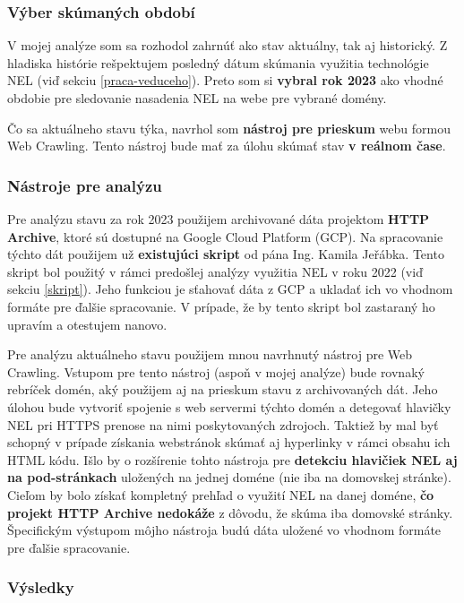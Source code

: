 \subsubsection{Výber skúmaných období}

V mojej analýze som sa rozhodol zahrnúť ako stav aktuálny, tak aj historický.
Z hladiska histórie rešpektujem posledný dátum skúmania využitia technológie NEL (viď sekciu \ref{praca-veduceho}).
Preto som si \textbf{vybral rok 2023} ako vhodné obdobie pre sledovanie nasadenia NEL na webe pre vybrané domény.

Čo sa aktuálneho stavu týka, navrhol som \textbf{nástroj pre prieskum} webu formou Web Crawling.
Tento nástroj bude mať za úlohu skúmať stav \textbf{v reálnom čase}.

\subsubsection{Nástroje pre analýzu}

Pre analýzu stavu za rok 2023 použijem archivované dáta projektom \textbf{HTTP Archive}, ktoré sú dostupné na Google Cloud Platform (GCP).
Na spracovanie týchto dát použijem už \textbf{existujúci skript} od pána Ing. Kamila Jeřábka. 
Tento skript bol použitý v rámci predošlej analýzy využitia NEL v roku 2022 (viď sekciu \ref{skript}).
Jeho funkciou je sťahovať dáta z GCP a ukladať ich vo vhodnom formáte pre ďalšie spracovanie.
V prípade, že by tento skript bol zastaraný ho upravím a otestujem nanovo.

Pre analýzu aktuálneho stavu použijem mnou navrhnutý nástroj pre Web Crawling. 
Vstupom pre tento nástroj (aspoň v mojej analýze) bude rovnaký rebríček domén, 
aký použijem aj na prieskum stavu z archivovaných dát.
Jeho úlohou bude vytvoriť spojenie s web servermi týchto domén a detegovať hlavičky NEL pri HTTPS prenose na nimi poskytovaných zdrojoch.
Taktiež by mal byť schopný v prípade získania webstránok skúmať aj hyperlinky v rámci obsahu ich HTML kódu.
Išlo by o rozšírenie tohto nástroja pre \textbf{detekciu hlavičiek NEL aj na pod-stránkach} uložených na jednej doméne (nie iba na domovskej stránke).
Cieľom by bolo získať kompletný prehľad o využití NEL na danej doméne, \textbf{čo projekt HTTP Archive nedokáže} z dôvodu, že skúma iba domovské stránky. 
Špecifickým výstupom môjho nástroja budú dáta uložené vo vhodnom formáte pre ďalšie spracovanie.


\subsubsection{Výsledky}

